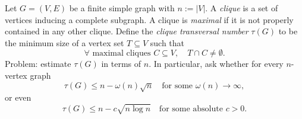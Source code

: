 Let $G=(V,E)$ be a finite simple graph with $n:=|V|$.
A \emph{clique} is a set of vertices inducing a complete subgraph.
A clique is \emph{maximal} if it is not properly contained in any other clique.
Define the \emph{clique transversal number} $\tau(G)$ to be the minimum size of a vertex set $T\subseteq V$ such that
\[
\forall \text{ maximal cliques }C\subseteq V,\quad T\cap C\neq\emptyset.
\]
Problem: estimate $\tau(G)$ in terms of $n$. In particular, ask whether for every $n$-vertex graph
\[
\tau(G) \le n - \omega(n)\sqrt n\quad \text{for some }\omega(n)\to\infty,
\]
or even
\[
\tau(G) \le n - c\sqrt{n\log n}\quad \text{for some absolute }c>0.
\]
